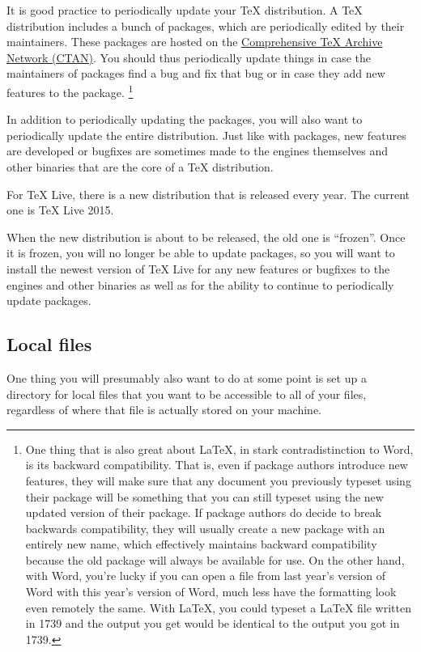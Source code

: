 It is good practice to periodically update your \TeX{} distribution.
A \TeX{} distribution includes a bunch of packages, which are periodically edited by their maintainers.
These packages are hosted on the \href{http://ctan.org/}{Comprehensive \TeX{} Archive Network (CTAN)}.
You should thus periodically update things in case the maintainers of packages find a bug and fix that bug or in case they add new features to the package.%
\footnote{%
One thing that is also great about \LaTeX, in stark contradistinction to Word, is its backward compatibility.
That is, even if package authors introduce new features, they will make sure that any document you previously typeset using their package will be something that you can still typeset using the new updated version of their package.
If package authors do decide to break backwards compatibility, they will usually create a new package with an entirely new name, which effectively maintains backward compatibility because the old package will always be available for use.
On the other hand, with Word, you're lucky if you can open a file from last year's version of Word with this year's version of Word, much less have the formatting look even remotely the same.
With \LaTeX, you could typeset a \LaTeX{} file written in 1739 and the output you get would be identical to the output you got in 1739.%
}

In addition to periodically updating the packages, you will also want to periodically update the entire distribution.
Just like with packages, new features are developed or bugfixes are sometimes made to the engines themselves and other binaries that are the core of a \TeX{} distribution.

For TeX Live, there is a new distribution that is released every year.
The current one is TeX Live 2015.

When the new distribution is about to be released, the old one is ``frozen''.
Once it is frozen, you will no longer be able to update packages, so you will want to install the newest version of TeX Live for any new features or bugfixes to the engines and other binaries as well as for the ability to continue to periodically update packages.

\subsection{Local files}
\label{subsec:local-files}

One thing you will presumably also want to do at some point is set up a directory for local files that you want to be accessible to all of your  files, regardless of where that  file is actually stored on your machine.

